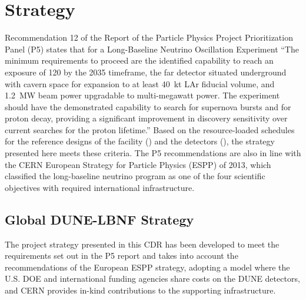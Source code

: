 
\chapter{Strategy}
\label{v1ch:strategy}


Recommendation 12 of the Report of the Particle Physics Project Prioritization Panel (P5) 
states that for a Long-Baseline Neutrino Oscillation Experiment ``The 
minimum requirements to proceed are the identified capability to reach an exposure 
of \num{120}\ktMWyr{} by the 2035 timeframe, the far detector situated underground 
with cavern space for expansion to at least 40~kt LAr fiducial volume, and 1.2~MW 
beam power upgradable to multi-megawatt power. The experiment should have the demonstrated 
capability to search for supernova bursts and for proton decay, providing a significant 
improvement in discovery sensitivity over current searches for the proton lifetime.'' 
Based on the resource-loaded schedules for the reference designs of the facility (\vollbnf)
and the detectors (\voldune), the strategy presented here meets these criteria. 
The P5 recommendations are also in line with the CERN European Strategy for Particle 
Physics (ESPP) of 2013, which classified the long-baseline neutrino program as 
one of the four scientific objectives with required international infrastructure.

\section{Global DUNE-LBNF Strategy}

The project strategy presented in this CDR has been developed to meet the requirements 
set out in the P5 report and %
takes into account the recommendations of the European 
ESPP strategy, adopting a model where the U.S. DOE and international funding agencies 
share costs on the DUNE detectors, and CERN provides in-kind contributions 
to the supporting infrastructure.


